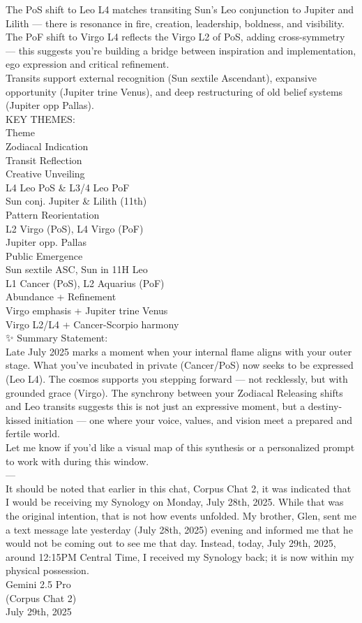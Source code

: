 \documentclass{article}
\begin{document}
The PoS shift to Leo L4 matches transiting Sun's Leo conjunction to
Jupiter and Lilith --- there is resonance in fire, creation, leadership,
boldness, and visibility.\\
The PoF shift to Virgo L4 reflects the Virgo L2 of PoS, adding
cross-symmetry --- this suggests you're building a bridge between
inspiration and implementation, ego expression and critical
refinement.\\
Transits support external recognition (Sun sextile Ascendant), expansive
opportunity (Jupiter trine Venus), and deep restructuring of old belief
systems (Jupiter opp Pallas).\\
 KEY THEMES:\\
Theme\\
Zodiacal Indication\\
Transit Reflection\\
Creative Unveiling\\
L4 Leo PoS \& L3/4 Leo PoF\\
Sun conj. Jupiter \& Lilith (11th)\\
Pattern Reorientation\\
L2 Virgo (PoS), L4 Virgo (PoF)\\
Jupiter opp. Pallas\\
Public Emergence\\
Sun sextile ASC, Sun in 11H Leo\\
L1 Cancer (PoS), L2 Aquarius (PoF)\\
Abundance + Refinement\\
Virgo emphasis + Jupiter trine Venus\\
Virgo L2/L4 + Cancer-Scorpio harmony\\
✨ Summary Statement:\\
Late July 2025 marks a moment when your internal flame aligns with your
outer stage. What you've incubated in private (Cancer/PoS) now seeks to
be expressed (Leo L4). The cosmos supports you stepping forward --- not
recklessly, but with grounded grace (Virgo). The synchrony between your
Zodiacal Releasing shifts and Leo transits suggests this is not just an
expressive moment, but a destiny-kissed initiation --- one where your
voice, values, and vision meet a prepared and fertile world.\\
Let me know if you'd like a visual map of this synthesis or a
personalized prompt to work with during this window.\\
---\\
It should be noted that earlier in this chat, Corpus Chat 2, it was
indicated that I would be receiving my Synology on Monday, July 28th,
2025. While that was the original intention, that is not how events
unfolded. My brother, Glen, sent me a text message late yesterday (July
28th, 2025) evening and informed me that he would not be coming out to
see me that day. Instead, today, July 29th, 2025, around 12:15PM Central
Time, I received my Synology back; it is now within my physical
possession.\\
Gemini 2.5 Pro\\
(Corpus Chat 2)\\
July 29th, 2025
\end{document}
